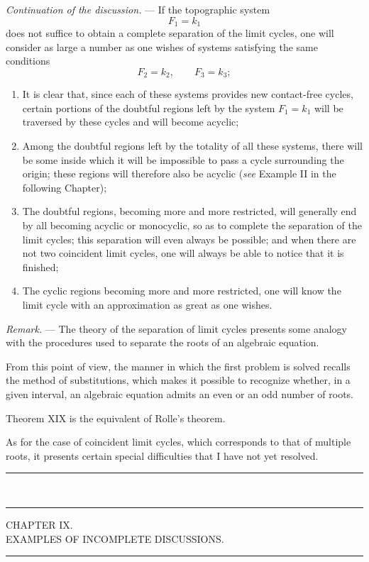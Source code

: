 \documentclass[11pt]{article}
\newcommand{\ornament}{\begin{center}\rule{2.5em}{0.4pt}\,\raisebox{0.1ex}{\tiny$\bullet\bullet\bullet$}\,\rule{2.5em}{0.4pt}\end{center}}
\newcommand{\shortline}{\begin{center}\rule{3.5em}{0.4pt}\end{center}}
\begin{document}
\emph{Continuation of the discussion.} --- If the topographic system
\[
F_1=k_1
\]
does not suffice to obtain a complete separation of the limit cycles, one will consider as large a number as one wishes of systems satisfying the same conditions
\[
F_2=k_2,
\qquad
F_3=k_3;
\]
\begin{enumerate}[label=\arabic*., leftmargin=3em]
\item It is clear that, since each of these systems provides new contact-free cycles, certain portions of the doubtful regions left by the system $F_1=k_1$ will be traversed by these cycles and will become acyclic;
\item Among the doubtful regions left by the totality of all these systems, there will be some inside which it will be impossible to pass a cycle surrounding the origin; these regions will therefore also be acyclic (\emph{see} Example II in the following Chapter);
\item The doubtful regions, becoming more and more restricted, will generally end by all becoming acyclic or monocyclic, so as to complete the separation of the limit cycles; this separation will even always be possible; and when there are not two coincident limit cycles, one will always be able to notice that it is finished;
\item The cyclic regions becoming more and more restricted, one will know the limit cycle with an approximation as great as one wishes.
\end{enumerate}

\emph{Remark.} --- The theory of the separation of limit cycles presents some analogy with the procedures used to separate the roots of an algebraic equation.

From this point of view, the manner in which the first problem is solved recalls the method of substitutions, which makes it possible to recognize whether, in a given interval, an algebraic equation admits an even or an odd number of roots.

Theorem XIX is the equivalent of Rolle’s theorem.

As for the case of coincident limit cycles, which corresponds to that of multiple roots, it presents certain special difficulties that I have not yet resolved.

\ornament

\begin{center}
{\Large CHAPTER IX.}\\[0.4em]
{\small EXAMPLES OF INCOMPLETE DISCUSSIONS.}
\end{center}
\shortline
\end{document}
